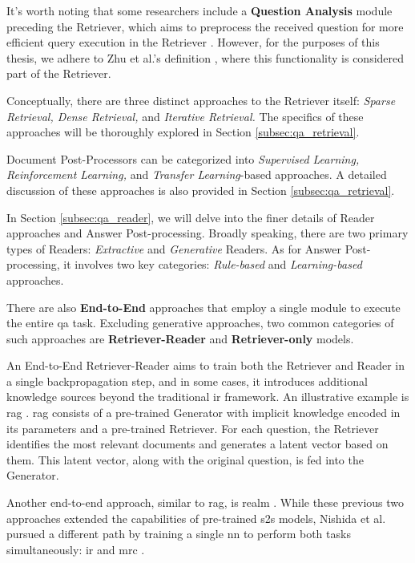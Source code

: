 It's worth noting that some researchers include a \textbf{Question Analysis} module preceding the Retriever, which aims to preprocess the received question for more efficient query execution in the Retriever \cite{nassiri_transformer_2023}. However, for the purposes of this thesis, we adhere to Zhu et al.'s definition \cite{zhu_retrieving_2021}, where this functionality is considered part of the Retriever.

Conceptually, there are three distinct approaches to the Retriever itself: \textit{Sparse Retrieval, Dense Retrieval,} and \textit{Iterative Retrieval.} The specifics of these approaches will be thoroughly explored in Section \ref{subsec:qa_retrieval}.

Document Post-Processors can be categorized into \textit{Supervised Learning, Reinforcement Learning,} and \textit{Transfer Learning}-based approaches. A detailed discussion of these approaches is also provided in Section \ref{subsec:qa_retrieval}.

In Section \ref{subsec:qa_reader}, we will delve into the finer details of Reader approaches and Answer Post-processing. Broadly speaking, there are two primary types of Readers: \textit{Extractive} and \textit{Generative} Readers. As for Answer Post-processing, it involves two key categories: \textit{Rule-based} and \textit{Learning-based} approaches.

There are also \textbf{End-to-End} approaches that employ a single module to execute the entire \gls{qa} task. Excluding generative approaches, two common categories of such approaches are \textbf{Retriever-Reader} and \textbf{Retriever-only} models.

An End-to-End Retriever-Reader aims to train both the Retriever and Reader in a single backpropagation step, and in some cases, it introduces additional knowledge sources beyond the traditional \gls{ir} framework. An illustrative example is \gls{rag} \cite{lewis_retrieval-augmented_2021}. \gls{rag} consists of a pre-trained Generator with implicit knowledge encoded in its parameters and a pre-trained Retriever. For each question, the Retriever identifies the most relevant documents and generates a latent vector based on them. This latent vector, along with the original question, is fed into the Generator.

Another end-to-end approach, similar to \gls{rag}, is \gls{realm} \cite{guu_realm_2020}. While these previous two approaches extended the capabilities of pre-trained \gls{s2s} models, Nishida et al. pursued a different path by training a single \gls{nn} to perform both tasks simultaneously: \gls{ir} and \gls{mrc} \cite{nishida_retrieve-and-read_2018}.

